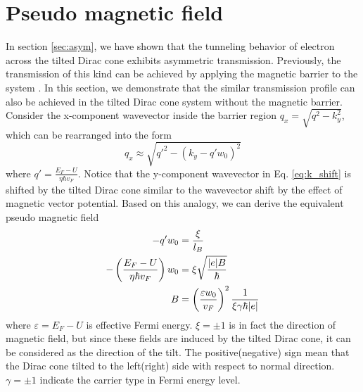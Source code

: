 \section{Pseudo magnetic field} \label{sec:pseudo b}
    In section \ref{sec:asym}, we have shown that the tunneling behavior of electron across the tilted Dirac cone exhibits asymmetric transmission. 
    Previously, the transmission of this kind can be achieved by applying the magnetic barrier to the system \cite{RamezaniMasir2008,RamezaniMasir2010}.
    In this section, we demonstrate that the similar transmission profile can also be achieved in the tilted Dirac cone system without the magnetic barrier.
    Consider the x-component wavevector inside the barrier region $q_x = \sqrt{q^2-k_y^2}$, which can be rearranged into the form
    \begin{equation} \label{eq:k_shift}
        q_x \approx \sqrt{q'^2 -(k_y-q'w_0)^2}
    \end{equation} 
    where $q' = \frac{E_F-U}{\eta \hbar v_F}$. 
    Notice that the y-component wavevector in Eq. \ref{eq:k_shift} is shifted by the tilted Dirac cone similar to the wavevector shift by the effect of magnetic vector potential.
    Based on this analogy, we can derive the equivalent pseudo magnetic field
    \begin{align} \label{eq:pseudo B}
        -q' w_0 &= \frac{\xi}{l_B} \notag \\
        -\left(\frac{E_F-U}{\eta \hbar v_F}\right) w_0 &= \xi\sqrt{\frac{|e| B}{\hbar}} \notag \\
        B &= \left(\frac{\varepsilon w_0}{v_F}\right)^2 \frac{1}{\xi \gamma \hbar |e|}
    \end{align}
    where $\varepsilon = E_F-U$ is effective Fermi energy. 
    $\xi = \pm 1$ is in fact the direction of magnetic field, but since these fields are induced by the tilted Dirac cone, it can be considered as the direction of the tilt.
    The positive(negative) sign mean that the Dirac cone tilted to the left(right) side with respect to normal direction. 
    $\gamma = \pm 1$ indicate the carrier type in Fermi energy level.


